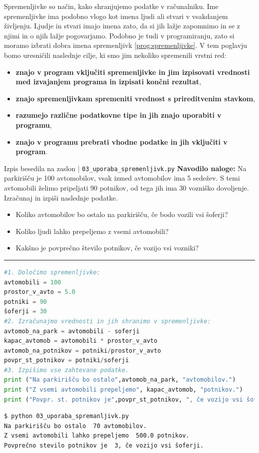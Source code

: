 Spremenljivke so način, kako shranjujemo podatke v računalniku. Ime
spremenljivke ima podobno vlogo kot imena ljudi ali stvari v vsakdanjem
življenju. Ljudje in stvari imajo imena zato, da si jih lažje zapomnimo in se z
njimi in o njih lažje pogovarjamo. Podobno je tudi v programiranju, zato si
moramo izbrati dobra imena spremenljivk \ref{prog:spremenljivke}. V tem poglavju
bomo uresničili naslednje cilje, ki smo jim nekoliko spremenili vrstni red:
\begin{itemize}
\tightlist
\item \textbf{znajo v program vključiti spremenljivke in jim izpisovati
    vrednosti med izvajanjem programa in izpisati končni rezultat},
\item \textbf{znajo spremenljivkam spremeniti vrednost s prireditvenim
  stavkom},
\item \textbf{ razumejo različne podatkovne tipe in jih znajo uporabiti v
  programu},
\item \textbf{znajo v programu prebrati vhodne podatke in jih vključiti v
  program}.
\end{itemize}

\begin{examplebox}[label={prog:spremenljivke}]{Izpis besedila na
    zaslon | \texttt{03\_uporaba\_spremenljivk.py} \cite{web:PTHardWay}}
  \textbf{Navodilo naloge:} Na parkirišču je 100 avtomobilov, vsak izmed
  avtomobilov ima 5 sedežev. S temi avtomobili želimo pripeljati 90 potnikov, od
  tega jih ima 30 vozniško dovoljenje. Izračunaj in izpiši naslednje podatke.
\begin{itemize}
\item Koliko avtomobilov bo ostalo na parkirišču, če bodo vozili vsi
  šoferji?
\item Koliko ljudi lahko prepeljemo z vsemi avtomobili?
\item Kakšno je povprečno število potnikov, če vozijo vsi vozniki?
\end{itemize}
\rule{\textwidth}{.4pt}
\begin{lstlisting}[language=Python]
#1. Določimo spremenljivke:
avtomobili = 100
prostor_v_avto = 5.0
potniki = 90
šoferji = 30
#2. Izračunajmo vrednosti in jih shranimo v spremenljivke:
avtomob_na_park = avtomobili - soferji
kapac_avtomob = avtomobili * prostor_v_avto
avtomob_na_potnikov = potniki/prostor_v_avto
povpr_st_potnikov = potniki/soferji
#3. Izpišimo vse zahtevane podatke.
print ("Na parkirišču bo ostalo",avtomob_na_park, "avtomobilov.")
print ("Z vsemi avtomobili prepeljemo", kapac_avtomob, "potnikov.")
print ("Povpr. st. potnikov je",povpr_st_potnikov, ", če vozijo vsi šoferji.")
\end{lstlisting}
\tcblower
\begin{Verbatim}[fontsize=\footnotesize]
$ python 03_uporaba_spremanljivk.py
Na parkirišču bo ostalo  70 avtomobilov.
Z vsemi avtomobili lahko prepeljemo  500.0 potnikov.
Povprečno stevilo potnikov je  3, če vozijo vsi šoferji.
\end{Verbatim}
\end{examplebox}

